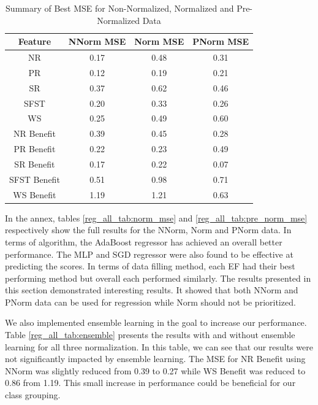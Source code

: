 \documentclass[12pt,letterpaper]{article}
\begin{document}
\begin{table}[H]
\centering
\begin{tabular}{|c|c|c|c|}
\hline
\textbf{Feature} & \textbf{\ac{NNorm} MSE} & \textbf{\ac{Norm} MSE} & \textbf{\ac{PNorm} MSE} \\
\hline
NR & 0.17 & 0.48 & 0.31 \\
\hline
PR & 0.12 & 0.19 & 0.21 \\
\hline
SR & 0.37 & 0.62 & 0.46 \\
\hline
SFST & 0.20 & 0.33 & 0.26 \\
\hline
WS & 0.25 & 0.49 & 0.60 \\
\hline
NR Benefit & 0.39 & 0.45 & 0.28 \\
\hline
PR Benefit & 0.22 & 0.23 & 0.49 \\
\hline
SR Benefit & 0.17 & 0.22 & 0.07 \\
\hline
SFST Benefit & 0.51 & 0.98 & 0.71 \\
\hline
WS Benefit & 1.19 & 1.21 & 0.63 \\
\hline
\end{tabular}
\caption{Summary of Best MSE for Non-Normalized, Normalized and Pre-Normalized Data}
\label{reg_all_tab:mse_summary}
\end{table}


In the annex, tables \ref{reg_all_tab:norm_mse} and \ref{reg_all_tab:pre_norm_mse} respectively show the full results for the \ac{NNorm}, \ac{Norm} and \ac{PNorm} data.
In terms of algorithm, the AdaBoost regressor has achieved an overall better performance.
The MLP and SGD regressor were also found to be effective at predicting the scores.
In terms of data filling method, each \ac{EF} had their best performing method but overall each performed similarly.
The results presented in this section demonstrated interesting results.
It showed that both \ac{NNorm} and \ac{PNorm} data can be used for regression while \ac{Norm} should not be prioritized.


We also implemented ensemble learning in the goal to increase our performance.
Table \ref{reg_all_tab:ensemble} presents the results with and without ensemble learning for all three normalization.
In this table, we can see that our results were not significantly impacted by ensemble learning.
The MSE for \ac{NR} Benefit using \ac{NNorm} was slightly reduced from 0.39 to 0.27 while \ac{WS} Benefit was reduced to 0.86 from 1.19.
This small increase in performance could be beneficial for our class grouping.
\end{document}

